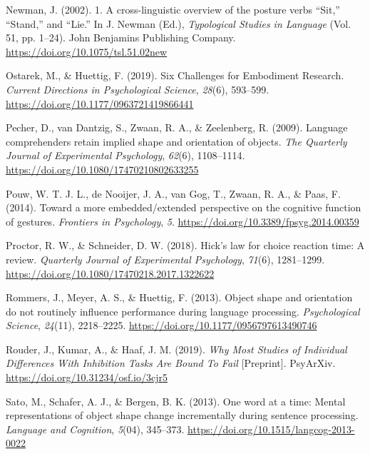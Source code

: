 \documentclass[
  man]{apa7}
\newlength{\cslhangindent}
\newlength{\cslentryspacingunit} %
\newenvironment{CSLReferences}[2] %
 {%
  \setlength{\parindent}{0pt}
  \ifodd #1
  \let\oldpar\par
  \def\par{\hangindent=\cslhangindent\oldpar}
  \fi
  \setlength{\parskip}{#2\cslentryspacingunit}
 }%
 {}
\begin{document}
\begin{CSLReferences}{1}{0}
\leavevmode{}%
Newman, J. (2002). 1. {A} cross-linguistic overview of the posture verbs {``{Sit},''} {``{Stand},''} and {``{Lie}.''} In J. Newman (Ed.), \emph{Typological {Studies} in {Language}} (Vol. 51, pp. 1--24). {John Benjamins Publishing Company}. \url{https://doi.org/10.1075/tsl.51.02new}

\leavevmode{}%
Ostarek, M., \& Huettig, F. (2019). Six {Challenges} for {Embodiment Research}. \emph{Current Directions in Psychological Science}, \emph{28}(6), 593--599. \url{https://doi.org/10.1177/0963721419866441}

\leavevmode{}%
Pecher, D., van Dantzig, S., Zwaan, R. A., \& Zeelenberg, R. (2009). Language comprehenders retain implied shape and orientation of objects. \emph{The Quarterly Journal of Experimental Psychology}, \emph{62}(6), 1108--1114. \url{https://doi.org/10.1080/17470210802633255}

\leavevmode{}%
Pouw, W. T. J. L., de Nooijer, J. A., van Gog, T., Zwaan, R. A., \& Paas, F. (2014). Toward a more embedded/extended perspective on the cognitive function of gestures. \emph{Frontiers in Psychology}, \emph{5}. \url{https://doi.org/10.3389/fpsyg.2014.00359}

\leavevmode{}%
Proctor, R. W., \& Schneider, D. W. (2018). Hick's law for choice reaction time: {A} review. \emph{Quarterly Journal of Experimental Psychology}, \emph{71}(6), 1281--1299. \url{https://doi.org/10.1080/17470218.2017.1322622}

\leavevmode{}%
Rommers, J., Meyer, A. S., \& Huettig, F. (2013). Object shape and orientation do not routinely influence performance during language processing. \emph{Psychological Science}, \emph{24}(11), 2218--2225. \url{https://doi.org/10.1177/0956797613490746}

\leavevmode{}%
Rouder, J., Kumar, A., \& Haaf, J. M. (2019). \emph{Why {Most Studies} of {Individual Differences With Inhibition Tasks Are Bound To Fail}} {[}Preprint{]}. {PsyArXiv}. \url{https://doi.org/10.31234/osf.io/3cjr5}

\leavevmode{}%
Sato, M., Schafer, A. J., \& Bergen, B. K. (2013). One word at a time: {Mental} representations of object shape change incrementally during sentence processing. \emph{Language and Cognition}, \emph{5}(04), 345--373. \url{https://doi.org/10.1515/langcog-2013-0022}


\end{CSLReferences}
\end{document}
